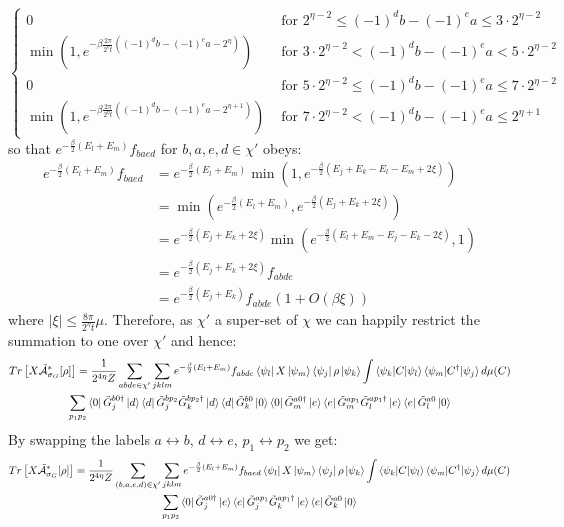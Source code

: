 \documentclass[aps,floatfix,10pt,amssymb,amsfont,amsmath,superscriptaddress,float,nofootinbib,longbibliography,nobalancelastpage,twocolumn]{revtex4-2}
\begin{document}
\begin{widetext}
\begin{equation}
\begin{cases}
    0&\text{ for }2^{\eta-2}\leq (-1)^db-(-1)^ea \leq 3\cdot2^{\eta-2}\\
     \min(1,e^{-\beta\frac{2\pi}{2^{\eta}t}((-1)^db-(-1)^ea-2^{\eta})})&\text{ for }3\cdot 2^{\eta-2}< (-1)^db-(-1)^ea < 5\cdot2^{\eta-2}\\
     0&\text{ for }5\cdot2^{\eta-2}\leq (-1)^db-(-1)^ea \leq 7\cdot2^{\eta-2}\\
     \min(1,e^{-\beta\frac{2\pi}{2^{\eta}t}((-1)^db-(-1)^ea-2^{\eta+1})})&\text{ for }7\cdot 2^{\eta-2}< (-1)^db-(-1)^ea \leq 2^{\eta+1}
    \end{cases}
\end{equation}
so that $e^{-\frac{\beta}{2}(E_l+E_m)}f_{baed}$ for $b, a, e, d \in \chi'$ obeys:
\begin{equation}
    \begin{aligned}
    e^{-\frac{\beta}{2}(E_l+E_m)}f_{baed} &= e^{-\frac{\beta}{2}(E_l+E_m)}\min(1,e^{-\frac{\beta}{2}(E_j+E_k-E_l-E_m + 2\xi)})\\
    &= \min(e^{-\frac{\beta}{2}(E_l+E_m)}, e^{-\frac{\beta}{2}(E_j+E_k + 2\xi)})\\
    &= e^{-\frac{\beta}{2}(E_j+E_k + 2\xi)} \min(e^{-\frac{\beta}{2}(E_l+E_m-E_j-E_k-2\xi)},1)\\
    &= e^{-\frac{\beta}{2}(E_j+E_k + 2\xi)}f_{abde}\\
    &= e^{-\frac{\beta}{2}(E_j+E_k)}f_{abde}(1+O(\beta\xi))
\end{aligned}
\label{eq:fabtofba}
\end{equation}
where $|\xi| \leq \frac{8\pi}{2^{\eta}t}\mu$. Therefore, as $\chi'$ a super-set of $\chi$ we can happily restrict the summation to one over $\chi'$ and hence:
\begin{multline}
   Tr\left[X\tilde{\mathcal{A}}^*_{\sigma_G}[\rho]\right] =\frac{1}{2^{4\eta}Z} \sum_{abde\in \chi'}\sum_{jklm} e^{-\frac{\beta}{2}(E_l+E_m)}f_{abde} \bra{\psi_l}X\ket{\psi_m}\bra{\psi_j}\rho\ket{\psi_k} \int \braket{\psi_k|C|\psi_l}\braket{\psi_m|C^{\dagger}|\psi_j} d\mu(C)\\\sum_{p_1p_2} \bra{0} \tilde G^{b0\dagger}_j\ket{d}\bra{d}\tilde G^{bp_2}_j\tilde G^{bp_2\dagger}_k\ket{d}\bra{d}\tilde G^{b0}_k\ket{0}
    \bra{0}\tilde G_m^{a0\dagger}\ket{e}\bra{e}\tilde G_m^{ap_1}\tilde G_l^{ap_1\dagger}\ket{e}\bra{e}\tilde G_l^{a0}\ket{0}
\end{multline}
By swapping the labels $a \leftrightarrow b$, $d \leftrightarrow e$, $p_1 \leftrightarrow p_2$ we get:
\begin{multline}
    Tr\left[X\tilde{\mathcal{A}}^*_{\sigma_G}[\rho]\right] =\frac{1}{2^{4\eta}Z} \sum_{(b,a,e,d)\in \chi'}\sum_{jklm} e^{-\frac{\beta}{2}(E_l+E_m)}f_{baed} \bra{\psi_l}X\ket{\psi_m}\bra{\psi_j}\rho\ket{\psi_k} \int \braket{\psi_k|C|\psi_l}\braket{\psi_m|C^{\dagger}|\psi_j} d\mu(C)\\\sum_{p_1p_2} \bra{0} \tilde G^{a0\dagger}_j\ket{e}\bra{e}\tilde G^{ap_1}_j\tilde G^{ap_1\dagger}_k\ket{e}\bra{e}\tilde G^{a0}_k\ket{0}

\end{multline}
\end{widetext}
\end{document}
